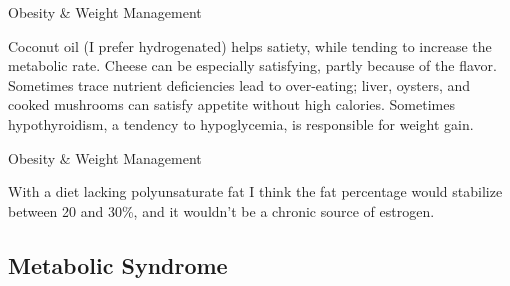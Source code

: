 \documentclass[11pt,oneside,openany,extrafontsizes]{memoir}
\begin{document}
\begin{standalonequote}{Obesity \& Weight Management}

    \begin{answer}
      Coconut oil (I prefer hydrogenated) helps satiety, while tending to increase the metabolic rate. Cheese can be especially satisfying, partly because of the flavor. Sometimes trace nutrient deficiencies lead to over-eating; liver, oysters, and cooked mushrooms can satisfy appetite without high calories. Sometimes hypothyroidism, a tendency to hypoglycemia, is responsible for weight gain.
    \end{answer}
\end{standalonequote}

\begin{standalonequote}{Obesity \& Weight Management}

    \begin{answer}
       With a diet lacking polyunsaturate fat I think the fat percentage would stabilize between 20 and 30\%, and it wouldn't be a chronic source of estrogen. 
    \end{answer}
\end{standalonequote}

\subsection{Metabolic Syndrome}
\end{document}
